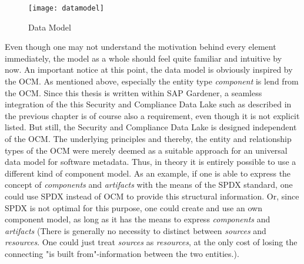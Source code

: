 \begin{figure}[H]
	\centering
	\texttt{[image: datamodel]}
	\caption[Data Model]{Data Model }
	\label{fig:DataModel}
\end{figure} 

Even though one may not understand the motivation behind every element immediately, the model as a whole should feel quite familiar and intuitive by now. An important notice at this point, the data model is obviously inspired by the OCM. As mentioned above, especially the entity type \emph{component} is lend from the OCM. Since this thesis is written within SAP Gardener, a seamless integration of the this Security and Compliance Data Lake such as described in the previous chapter is of course also a requirement, even though it is not explicit listed. But still, the Security and Compliance Data Lake is designed independent of the OCM. The underlying principles and thereby, the entity and relationship types of the OCM were merely deemed as a suitable approach for an universal data model for software metadata. Thus, in theory it is entirely possible to use a different kind of component model. As an example, if one is able to express the concept of \emph{components} and \emph{artifacts} with the means of the SPDX standard, one could use SPDX instead of OCM to provide this structural information. Or, since SPDX is not optimal for this purpose, one could create and use an own component model, as long as it has the means to express \emph{components} and \emph{artifacts} (There is generally no necessity to distinct between \emph{sources} and \emph{resources}. One could just treat \emph{sources} as \emph{resources}, at the only cost of losing the connecting "is built from"-information between the two entities.).\\\par 

